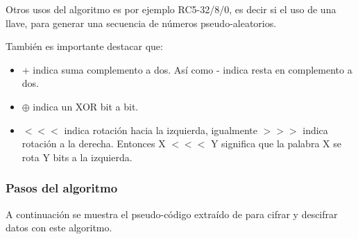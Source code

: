 Otros usos del algoritmo es por ejemplo \citep{rivest} RC5-32/8/0, es decir si el uso de una llave, para generar una secuencia de números pseudo-aleatorios.


También es importante destacar que:
\begin{itemize}
\item + indica suma complemento a dos. Así como - indica resta en complemento a dos.
\item $\oplus$ indica un XOR bit a bit.
\item $<<<$ indica rotación hacia la izquierda, igualmente $>>>$ indica rotación a la derecha. Entonces X $<<<$ Y significa que la palabra X se rota Y bits a la izquierda.
\end{itemize}

\subsubsection{Pasos del algoritmo}
A continuación se muestra el pseudo-código extraído de \cite{rivest} para cifrar y descifrar datos con este algoritmo. 
